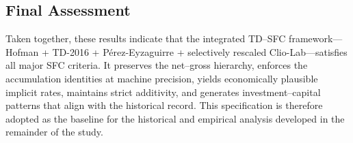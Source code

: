 \subsection{Final Assessment}

Taken together, these results indicate that the integrated TD--SFC framework---Hofman + TD-2016 + Pérez-Eyzaguirre + selectively rescaled Clio-Lab---satisfies all major SFC criteria. It preserves the net--gross hierarchy, enforces the accumulation identities at machine precision, yields economically plausible implicit rates, maintains strict additivity, and generates investment--capital patterns that align with the historical record. This specification is therefore adopted as the baseline for the historical and empirical analysis developed in the remainder of the study.
